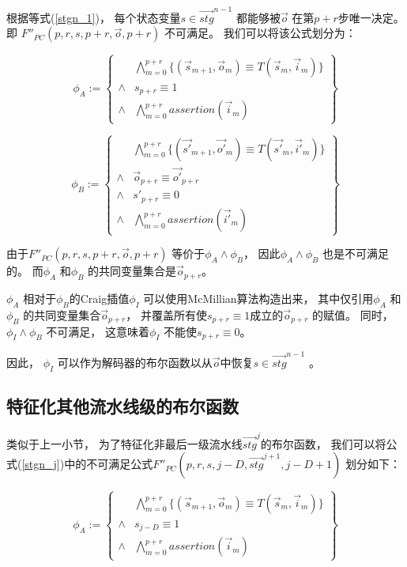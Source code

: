 根据等式(\ref{stgn_1})，
每个状态变量$s\in \vec{stg}^{n-1}$ 都能够被$\vec{o}$ 在第$p+r$步唯一决定。
即
$F''_{PC}(p,r,s,p+r,\vec{o},p+r)$ 不可满足。
我们可以将该公式划分为：

\begin{equation}
 \phi_A :=
 \left\{
\begin{array}{cc}
&\bigwedge_{m=0}^{p+r}
\{
(\vec{s}_{m+1},\vec{o}_m)\equiv T(\vec{s}_m,\vec{i}_m)
\}
\\
\wedge& s_{p+r}\equiv 1\\
\wedge&\bigwedge_{m=0}^{p+r}assertion(\vec{i}_m) 
\end{array}
\right\}
\end{equation}

\begin{equation}
\phi_B :=
\left\{
\begin{array}{cc}
&\bigwedge_{m=0}^{p+r}
\{
(\vec{s'}_{m+1},\vec{o'}_m)\equiv T(\vec{s'}_m,\vec{i'}_m)
\}
\\
\wedge&\vec{o}_{p+r}\equiv \vec{o'}_{p+r} \\
\wedge& s'_{p+r}\equiv 0\\
\wedge&\bigwedge_{m=0}^{p+r}assertion(\vec{i'}_m)
\end{array}
\right\}
\end{equation}

由于$F''_{PC}(p,r,s,p+r,\vec{o},p+r)$ 等价于$\phi_A \wedge \phi_B$，
因此$\phi_A \wedge \phi_B$ 也是不可满足的。
而$\phi_A$ 和$\phi_B$ 的共同变量集合是$\vec{o}_{p+r}$。


$\phi_A$ 相对于$\phi_B$的Craig插值$\phi_I$ 可以使用McMillian算法构造出来，
其中仅引用$\phi_A$ 和$\phi_B$ 的共同变量集合$\vec{o}_{p+r}$，
并覆盖所有使$s_{p+r}\equiv 1$成立的$\vec{o}_{p+r}$ 的赋值。
同时，
$\phi_I\wedge \phi_B$  不可满足，
这意味着$\phi_I$ 不能使$s_{p+r}\equiv 0$。

因此，
$\phi_I$ 可以作为解码器的布尔函数以从$\vec{o}$中恢复$s\in \vec{stg}^{n-1}$ 。

\subsection{特征化其他流水线级的布尔函数}
类似于上一小节，
为了特征化非最后一级流水线$\vec{stg}^j$的布尔函数，
我们可以将公式(\ref{stgn_j})中的不可满足公式$F''_{PC}(p,r,s,j-D,\vec{stg}^{j+1},j-D+1)$
划分如下：

\begin{equation}
 \phi_A :=
 \left\{
\begin{array}{cc}
&\bigwedge_{m=0}^{p+r}
\{
(\vec{s}_{m+1},\vec{o}_m)\equiv T(\vec{s}_m,\vec{i}_m)
\}
\\
\wedge& s_{j-D}\equiv 1\\
\wedge&\bigwedge_{m=0}^{p+r}assertion(\vec{i}_m) 
\end{array}
\right\}
\end{equation}

